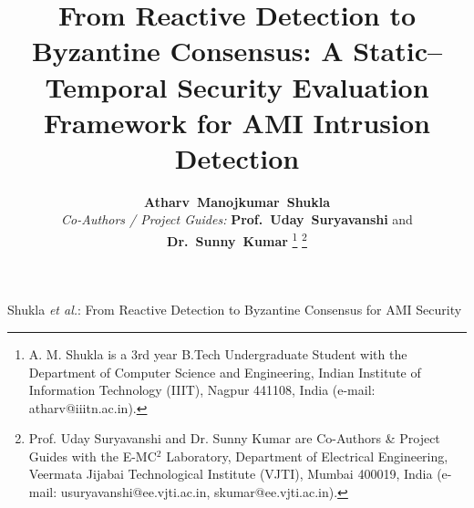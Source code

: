 \documentclass[10pt,twocolumn,journal]{IEEEtran}
\begin{document}
\title{\Huge\bfseries From Reactive Detection to Byzantine Consensus: A Static–Temporal Security Evaluation Framework for AMI Intrusion Detection}

\author{\textbf{Atharv~Manojkumar~Shukla}\\
\vspace{0.15cm}
\small \emph{Co-Authors / Project Guides:} \textbf{Prof.~Uday~Suryavanshi} and \textbf{Dr.~Sunny~Kumar}%
\thanks{A. M. Shukla is a 3rd year B.Tech Undergraduate Student with the Department of Computer Science and Engineering, Indian Institute of Information Technology (IIIT), Nagpur 441108, India (e-mail: atharv@iiitn.ac.in).}%
\thanks{Prof. Uday Suryavanshi and Dr. Sunny Kumar are Co-Authors \& Project Guides with the E-MC$^2$ Laboratory, Department of Electrical Engineering, Veermata Jijabai Technological Institute (VJTI), Mumbai 400019, India (e-mail: usuryavanshi@ee.vjti.ac.in, skumar@ee.vjti.ac.in).}}

%
{Shukla \MakeLowercase{\textit{et al.}}: From Reactive Detection to Byzantine Consensus for AMI Security}

\maketitle
\end{document}
